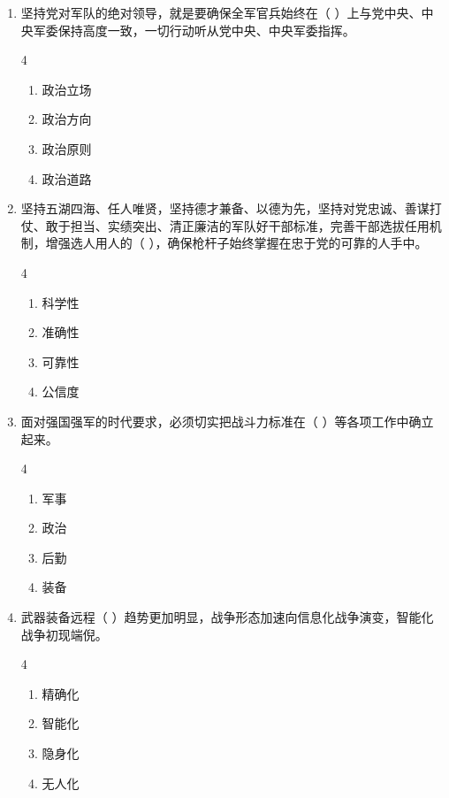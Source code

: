 \documentclass[a4paper,11pt]{ctexart}
\begin{document}
\begin{enumerate}
    \item 坚持党对军队的绝对领导，就是要确保全军官兵始终在（ ）上与党中央、中央军委保持高度一致，一切行动听从党中央、中央军委指挥。
    \begin{multicols}{4}
    \begin{enumerate}
        \item 政治立场
        \item 政治方向
        \item 政治原则
        \item 政治道路
    \end{enumerate}
    \end{multicols}

    \item 坚持五湖四海、任人唯贤，坚持德才兼备、以德为先，坚持对党忠诚、善谋打仗、敢于担当、实绩突出、清正廉洁的军队好干部标准，完善干部选拔任用机制，增强选人用人的（ ），确保枪杆子始终掌握在忠于党的可靠的人手中。
    \begin{multicols}{4}
    \begin{enumerate}
        \item 科学性
        \item 准确性
        \item 可靠性
        \item 公信度
    \end{enumerate}
    \end{multicols}

    \item 面对强国强军的时代要求，必须切实把战斗力标准在（ ）等各项工作中确立起来。
    \begin{multicols}{4}
    \begin{enumerate}
        \item 军事
        \item 政治
        \item 后勤
        \item 装备
    \end{enumerate}
    \end{multicols}

    \item 武器装备远程（ ）趋势更加明显，战争形态加速向信息化战争演变，智能化战争初现端倪。
    \begin{multicols}{4}
    \begin{enumerate}
        \item 精确化
        \item 智能化
        \item 隐身化
        \item 无人化
    \end{enumerate}
    \end{multicols}


\end{enumerate}
\end{document}
